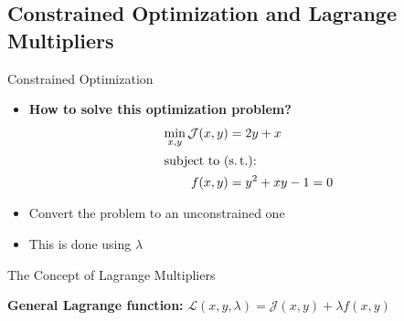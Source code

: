 \subsection{Constrained Optimization and Lagrange Multipliers}

\begin{frame}{Constrained Optimization}{}\important
	\begin{itemize}
		\item \textbf{How to solve this optimization problem?}
		\begin{align*}
			\min_{x, y} \mathcal{J}(x,y)
				&= 2y + x 		\\
			\intertext{subject to (s.\,t.):}
			f(x, y)
				&= y^2 + xy - 1 = 0
		\end{align*}
		\item Convert the problem to an unconstrained one
		\item This is done using  $\lambda$
	\end{itemize}
\end{frame}


\begin{frame}{The Concept of Lagrange Multipliers}{}\important
	\begin{boxBlueNoFrame}
		\textbf{General Lagrange function:} $\mathcal{L}(x, y, \lambda) = \mathcal{J}(x,y) + \lambda f(x,y)$
	\end{boxBlueNoFrame}

	\vspace*{3mm}
\end{frame}


